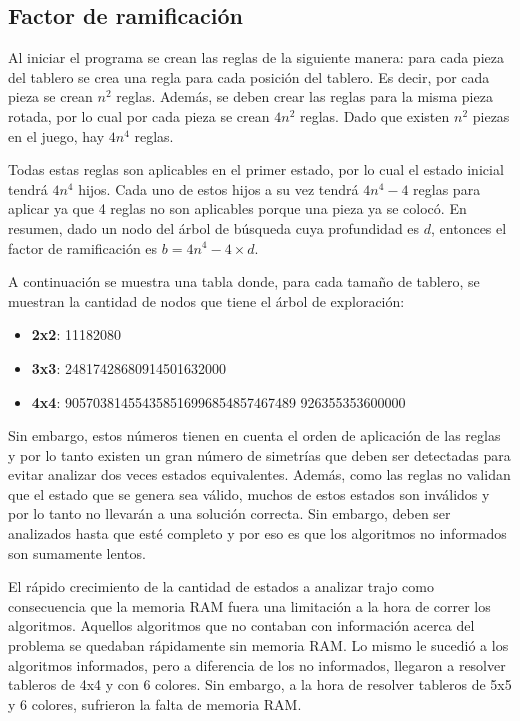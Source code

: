 \documentclass[11pt,twocolumn]{article}
\begin{document}
    \subsection{Factor de ramificación}
        \par Al iniciar el programa se crean las reglas de la siguiente manera: para cada pieza del tablero se crea una regla para cada posición del tablero. Es decir, por cada pieza se crean $n^2$ reglas. Además, se deben crear las reglas para la misma pieza rotada, por lo cual por cada pieza se crean $4 n^2$ reglas. Dado que existen $n^2$ piezas en el juego, hay $4 n^4$ reglas.
        \par Todas estas reglas son aplicables en el primer estado, por lo cual el estado inicial tendrá $4 n^4$ hijos. Cada uno de estos hijos a su vez tendrá $4 n^4 - 4$ reglas para aplicar ya que 4 reglas no son aplicables porque una pieza ya se colocó. En resumen, dado un nodo del árbol de búsqueda cuya profundidad es $d$, entonces el factor de ramificación es $b = 4 n^4 - 4 \times d$.
        \par A continuación se muestra una tabla donde, para cada tamaño de tablero, se muestran la cantidad de nodos que tiene el árbol de exploración:
        \begin{itemize}
            \item \textbf{2x2}: 11182080
            \item \textbf{3x3}: 24817428680914501632000
            \item \textbf{4x4}: 905703814554358516996854857467489
            926355353600000
        \end{itemize}
    \par Sin embargo, estos números tienen en cuenta el orden de aplicación de las reglas y por lo tanto existen un gran número de simetrías que deben ser detectadas para evitar analizar dos veces estados equivalentes. Además, como las reglas no validan que el estado que se genera sea válido, muchos de estos estados son inválidos y por lo tanto no llevarán a una solución correcta. Sin embargo, deben ser analizados hasta que esté completo y por eso es que los algoritmos no informados son sumamente lentos.
    \par El rápido crecimiento de la cantidad de estados a analizar trajo como consecuencia que la memoria RAM fuera una limitación a la hora de correr los algoritmos. Aquellos algoritmos que no contaban con información acerca del problema se quedaban rápidamente sin memoria RAM. Lo mismo le sucedió a los algoritmos informados, pero a diferencia de los no informados, llegaron a resolver tableros de 4x4 y con 6 colores. Sin embargo, a la hora de resolver tableros de 5x5 y 6 colores, sufrieron la falta de memoria RAM.
\end{document}
